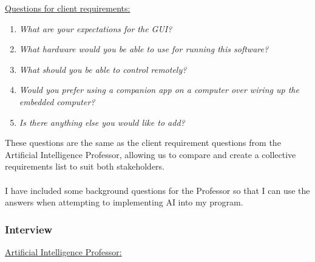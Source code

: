 \documentclass[11pt]{report}
\begin{document}
			\underline{Questions for client requirements:}
				\begin{enumerate}
					\item{\emph{What are your expectations for the GUI?}}
					\item{\emph{What hardware would you be able to use for running this software?}}
					\item{\emph{What should you be able to control remotely?}}
					\item{\emph{Would you prefer using a companion app on a computer over wiring up the embedded computer?}}
					\item{\emph{Is there anything else you would like to add?}}
				\end{enumerate}
			These questions are the same as the client requirement questions from the Artificial Intelligence Professor, allowing us to compare and create a collective requirements list to suit both stakeholders.\\\\
			I have included some background questions for the Professor so that I can use the answers when attempting to implementing AI into my program.  

		\subsubsection{Interview}
			\underline{Artificial Intelligence Professor:}\\
\end{document}

